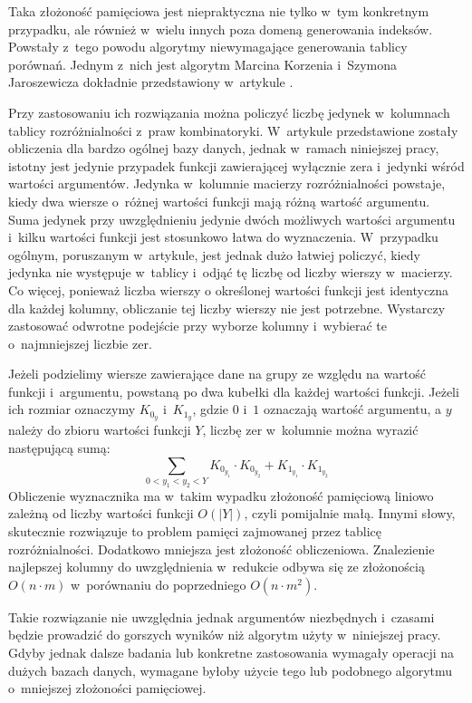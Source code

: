 Taka złożoność pamięciowa jest niepraktyczna nie tylko w~tym konkretnym przypadku,
ale również w~wielu innych poza domeną generowania indeksów.
Powstały z~tego powodu algorytmy niewymagające generowania tablicy porównań.
Jednym z~nich jest algorytm Marcina Korzenia i~Szymona Jaroszewicza dokładnie przedstawiony w~artykule \cite{without-matrix}.

Przy zastosowaniu ich rozwiązania można policzyć liczbę jedynek w~kolumnach tablicy rozróżnialności z~praw kombinatoryki.
W~artykule przedstawione zostały obliczenia dla bardzo ogólnej bazy danych,
jednak w~ramach niniejszej pracy,
istotny jest jedynie przypadek funkcji zawierającej wyłącznie zera i~jedynki wśród wartości argumentów.
Jedynka w~kolumnie macierzy rozróżnialności powstaje,
kiedy dwa wiersze o~różnej wartości funkcji mają różną wartość argumentu.
Suma jedynek przy uwzględnieniu jedynie dwóch możliwych wartości argumentu i~kilku wartości funkcji jest stosunkowo łatwa do wyznaczenia.
W~przypadku ogólnym,
poruszanym w~artykule,
jest jednak dużo łatwiej policzyć,
kiedy jedynka nie występuje w~tablicy i~odjąć tę liczbę od liczby wierszy w~macierzy.
Co więcej,
ponieważ liczba wierszy o określonej wartości funkcji jest identyczna dla każdej kolumny,
obliczanie tej liczby wierszy nie jest potrzebne.
Wystarczy zastosować odwrotne podejście przy wyborze kolumny i~wybierać te o~najmniejszej liczbie zer.

Jeżeli podzielimy wiersze zawierające dane na grupy ze względu na wartość funkcji i~argumentu,
powstaną po dwa kubełki dla każdej wartości funkcji.
Jeżeli ich rozmiar oznaczymy $K_{0_y}$ i~$K_{1_y}$,
 gdzie $0$ i~$1$ oznaczają wartość argumentu,
a $y$ należy do zbioru wartości funkcji $Y$,
liczbę zer w~kolumnie można wyrazić następującą sumą:
\begin{equation}
\sum_{0<y_1<y_2<Y} K_{0_{y_1}} \cdot K_{0_{y_2}} + K_{1_{y_1}} \cdot K_{1_{y_2}}
\end{equation}
Obliczenie wyznacznika ma w~takim wypadku złożoność pamięciową liniowo zależną od liczby wartości funkcji $O(\left\vert{Y}\right\vert)$,
czyli pomijalnie małą.
Innymi słowy, skutecznie rozwiązuje to problem pamięci zajmowanej przez tablicę rozróżnialności.
Dodatkowo mniejsza jest złożoność obliczeniowa.
Znalezienie najlepszej kolumny do uwzględnienia w~redukcie odbywa się ze złożonością $O(n \cdot m)$ w~porównaniu do poprzedniego $O(n \cdot m^2)$.

Takie rozwiązanie nie uwzględnia jednak argumentów niezbędnych i~czasami będzie prowadzić do gorszych wyników niż algorytm użyty w~niniejszej pracy.
Gdyby jednak dalsze badania lub konkretne zastosowania wymagały operacji na dużych bazach danych,
wymagane byłoby użycie tego lub podobnego algorytmu o~mniejszej złożoności pamięciowej.

